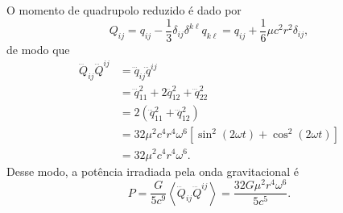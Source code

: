 O momento de quadrupolo reduzido é dado por
\begin{equation*}
    Q_{ij} = q_{ij} - \frac13 \delta_{ij} \delta^{k\ell}q_{k\ell} = q_{ij} + \frac16 \mu c^2 r^2 \delta_{ij},
\end{equation*}
de modo que
\begin{align*}
    \dddot{Q}_{ij} \dddot{Q}^{ij} &= \dddot{q}_{ij} \dddot{q}^{ij}\\&= \dddot{q}_{11}^2 + 2\dddot{q}_{12}^2 + \dddot{q}_{22}^2\\&= 2\left(\dddot{q}_{11}^2 + \dddot{q}_{12}^2\right)\\&= 32 \mu^2 c^4 r^4 \omega^6 \left[\sin^2(2 \omega t) + \cos^2(2 \omega t)\right]\\&= 32 \mu^2 c^4 r^4 \omega^6.
\end{align*}
Desse modo, a potência irradiada pela onda gravitacional é
\begin{equation*}
    P = \frac{G}{5c^9}\left\langle \dddot{Q}_{ij}\dddot{Q}^{ij}\right\rangle = \frac{32 G \mu^2 r^4 \omega^6}{5c^5}.
\end{equation*}


